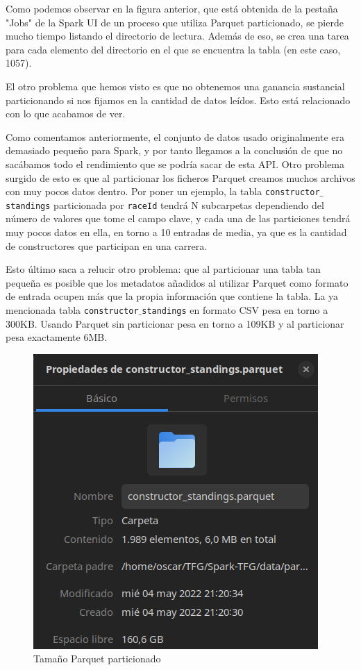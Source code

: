 \documentclass[12pt,twoside,titlepage]{report}
\begin{document}
Como podemos observar en la figura anterior, que está obtenida de la pestaña "Jobs" de la Spark UI de un proceso que utiliza Parquet particionado, se pierde mucho tiempo listando el directorio de lectura. Además de eso, se crea una tarea para cada elemento del directorio en el que se encuentra la tabla (en este caso, 1057).

El otro problema que hemos visto es que no obtenemos una ganancia sustancial particionando si nos fijamos en la cantidad de datos leídos. Esto está relacionado con lo que acabamos de ver.

Como comentamos anteriormente, el conjunto de datos usado originalmente era demasiado pequeño para Spark, y por tanto llegamos a la conclusión de que no sacábamos todo el rendimiento que se podría sacar de esta API. Otro problema surgido de esto es que al particionar los ficheros Parquet creamos muchos archivos con muy pocos datos dentro. Por poner un ejemplo, la tabla \texttt{constructor$\_$standings} particionada por \texttt{raceId} tendrá N subcarpetas dependiendo del número de valores que tome el campo clave, y cada una de las particiones tendrá muy pocos datos en ella, en torno a 10 entradas de media, ya que es la cantidad de constructores que participan en una carrera.

Esto último saca a relucir otro problema: que al particionar una tabla tan pequeña es posible que los metadatos añadidos al utilizar Parquet como formato de entrada ocupen más que la propia información que contiene la tabla. La ya mencionada tabla \texttt{constructor$\_$standings} en formato CSV pesa en torno a 300KB. Usando Parquet sin particionar pesa en torno a 109KB y al particionar pesa exactamente 6MB.

\begin{figure}[H]
	\includegraphics[scale=0.35]{pesoparquetparticionado.png}
	\centering
	\caption{Tamaño Parquet particionado}
	\label{fig:pesoparquetparticionado}
	\centering
\end{figure}
\end{document}
